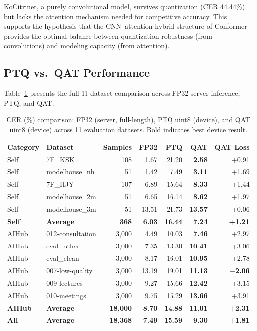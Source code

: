 \documentclass[a4paper,11pt,twocolumn]{article}
\begin{document}
KoCitrinet, a purely convolutional model, survives quantization (CER 44.44\%) but lacks the attention mechanism needed for competitive accuracy. This supports the hypothesis that the CNN--attention hybrid structure of Conformer provides the optimal balance between quantization robustness (from convolutions) and modeling capacity (from attention).

\subsection{PTQ vs.\ QAT Performance}

Table~\ref{tab:qat} presents the full 11-dataset comparison across FP32 server inference, PTQ, and QAT.

\begin{table}[t]
\centering
\caption{CER (\%) comparison: FP32 (server, full-length), PTQ uint8 (device), and QAT uint8 (device) across 11 evaluation datasets. Bold indicates best device result.}
\label{tab:qat}
\small
\begin{tabular}{@{}llrrrrr@{}}
\toprule
Category & Dataset & Samples & FP32 & PTQ & QAT & QAT Loss \\
\midrule
Self & 7F\_KSK & 108 & 1.67 & 21.20 & \textbf{2.58} & +0.91 \\
Self & modelhouse\_nh & 51 & 1.42 & 7.49 & \textbf{3.11} & +1.69 \\
Self & 7F\_HJY & 107 & 6.89 & 15.64 & \textbf{8.33} & +1.44 \\
Self & modelhouse\_2m & 51 & 6.65 & 16.14 & \textbf{8.62} & +1.97 \\
Self & modelhouse\_3m & 51 & 13.51 & 21.73 & \textbf{13.57} & +0.06 \\
\textbf{Self} & \textbf{Average} & \textbf{368} & \textbf{6.03} & \textbf{16.44} & \textbf{7.24} & \textbf{+1.21} \\
\midrule
AIHub & 012-consultation & 3,000 & 4.49 & 10.03 & \textbf{7.46} & +2.97 \\
AIHub & eval\_other & 3,000 & 7.35 & 13.30 & \textbf{10.41} & +3.06 \\
AIHub & eval\_clean & 3,000 & 8.17 & 16.01 & \textbf{10.95} & +2.78 \\
AIHub & 007-low-quality & 3,000 & 13.19 & 19.01 & \textbf{11.13} & \textbf{$-$2.06} \\
AIHub & 009-lectures & 3,000 & 9.27 & 15.66 & \textbf{12.42} & +3.15 \\
AIHub & 010-meetings & 3,000 & 9.75 & 15.29 & \textbf{13.66} & +3.91 \\
\textbf{AIHub} & \textbf{Average} & \textbf{18,000} & \textbf{8.70} & \textbf{14.88} & \textbf{11.01} & \textbf{+2.31} \\
\midrule
\textbf{All} & \textbf{Average} & \textbf{18,368} & \textbf{7.49} & \textbf{15.59} & \textbf{9.30} & \textbf{+1.81} \\
\bottomrule
\end{tabular}
\end{table}
\end{document}
